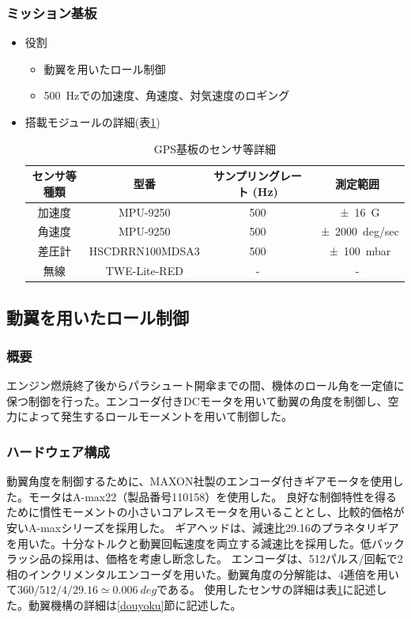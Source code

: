 \documentclass[a4paper,11pt,uplatex]{jsarticle}
\begin{document}
\subsubsection{ミッション基板}
\begin{itemize}
	\item 役割
	      \begin{itemize}
		      \item 動翼を用いたロール制御
		      \item \SI{500}{Hz}での加速度、角速度、対気速度のロギング
	      \end{itemize}

	\item 搭載モジュールの詳細(表\ref{tab:mission_detail})
	      \begin{table}[H]
		      \centering
		      \caption{GPS基板のセンサ等詳細}
		      \begin{tabular}{cccc} \toprule
			      センサ等種類 & 型番              & サンプリングレート (\si{Hz}) & 測定範囲                 \\ \midrule
			      加速度    & MPU-9250        & 500                 & \SI{+-16}{G}         \\
			      角速度    & MPU-9250        & 500                 & \SI{+-2000}{deg/sec} \\
			      差圧計    & HSCDRRN100MDSA3 & 500                 & \SI{+-100}{mbar}     \\
			      無線     & TWE-Lite-RED    & -                   & -                    \\
			      \bottomrule
		      \end{tabular}
		      \label{tab:mission_detail}
	      \end{table}
\end{itemize}

\subsection{動翼を用いたロール制御}
\subsubsection{概要}
エンジン燃焼終了後からパラシュート開傘までの間、機体のロール角を一定値に保つ制御を行った。エンコーダ付きDCモータを用いて動翼の角度を制御し、空力によって発生するロールモーメントを用いて制御した。
\subsubsection{ハードウェア構成}
動翼角度を制御するために、MAXON社製のエンコーダ付きギアモータを使用した。モータはA-max22（製品番号110158）を使用した。
良好な制御特性を得るために慣性モーメントの小さいコアレスモータを用いることとし、比較的価格が安いA-maxシリーズを採用した。
ギアヘッドは、減速比29.16のプラネタリギアを用いた。十分なトルクと動翼回転速度を両立する減速比を採用した。低バックラッシ品の採用は、価格を考慮し断念した。
エンコーダは、512パルス/回転で2相のインクリメンタルエンコーダを用いた。動翼角度の分解能は、4逓倍を用いて$360/512/4/29.16\simeq \SI{0.006}{deg}$である。
使用したセンサの詳細は表\ref{tab:mission_detail}に記述した。動翼機構の詳細は\ref{douyoku}節に記述した。
\end{document}
